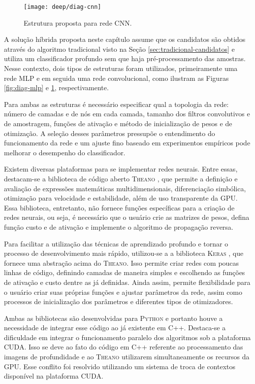 \begin{figure}
\centering
\texttt{[image: deep/diag-cnn]}
\caption{Estrutura proposta para rede CNN.}
\label{fig:diag-cnn}
\end{figure}

A solução híbrida proposta neste capítulo assume que os candidatos são obtidos através do algoritmo tradicional visto na Seção \ref{sec:tradicional-candidatos} e utiliza um classificador profundo sem que haja pré-processamento das amostras. Nesse contexto, dois tipos de estruturas foram utilizados, primeiramente uma rede MLP e em seguida uma rede convolucional, como ilustram as Figuras \ref{fig:diag-mlp} e \ref{fig:diag-cnn}, respectivamente. 

Para ambas as estruturas é necessário especificar qual a topologia da rede: número de camadas e de nós em cada camada, tamanho dos filtros convolutivos e de amostragem, funções de ativação e método de inicialização de pesos e de otimização.  A seleção desses parâmetros pressupõe o entendimento do funcionamento da rede e um ajuste fino baseado em experimentos empíricos pode melhorar o desempenho do classificador.

Existem diversas plataformas para se implementar redes neurais. Entre essas, destacam-se a biblioteca de código aberto \textsc{Theano} \cite{theano}, que permite a definição e avaliação de expressões matemáticas multidimensionais, diferenciação simbólica, otimização para velocidade e estabilidade, além de uso transparente da GPU. Essa biblioteca, entretanto, não fornece funções específicas para a criação de redes neurais, ou seja, é necessário que o usuário crie as matrizes de pesos, defina função custo e de ativação e implemente o algoritmo de propagação reversa.

Para facilitar a utilização das técnicas de aprendizado profundo e tornar o processo de desenvolvimento mais rápido, utilizou-se a a biblioteca \textsc{Keras} \cite{keras}, que fornece uma abstração acima do \textsc{Theano}. Isso permite criar redes com poucas linhas de código, definindo camadas de maneira simples e escolhendo as funções de ativação e custo dentre as já definidas. Ainda assim, permite flexibilidade para o usuário criar suas próprias funções e ajustar parâmetros da rede, assim como processos de inicialização dos parâmetros e diferentes tipos de otimizadores.

Ambas as bibliotecas são desenvolvidas para \textsc{Python} e portanto houve a necessidade de integrar esse código ao já existente em C++. Destaca-se a dificuldade em integrar o funcionamento paralelo dos algoritmos sob a plataforma CUDA. Isso se deve ao fato do código em C++ referente ao processamento das imagens de profundidade e ao \textsc{Theano} utilizarem simultaneamente os recursos da GPU. Esse conflito foi resolvido utilizando um sistema de troca de contextos disponível na plataforma CUDA.

